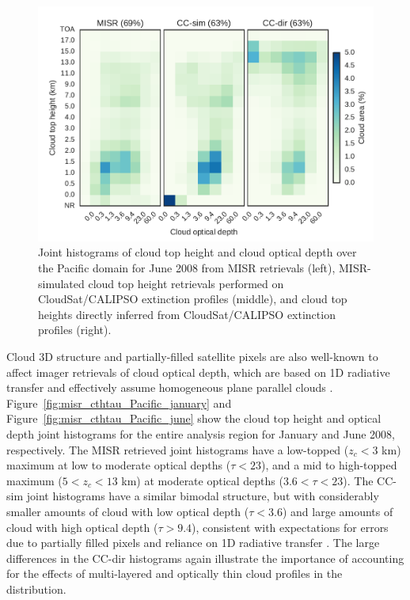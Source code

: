 \begin{figure}[tp]
\centering
\includegraphics{graphics/misr_clmisr_Pacific_2008-06.pdf}
\caption{\label{fig:misr_cthtau_Pacific_june}Joint histograms of cloud
top height and cloud optical depth over the Pacific domain for June 2008
from MISR retrievals (left), MISR-simulated cloud top height retrievals
performed on CloudSat/CALIPSO extinction profiles (middle), and cloud
top heights directly inferred from CloudSat/CALIPSO extinction profiles
(right).}\label{fig:misrux5fcthtauux5fPacificux5fjune}
\end{figure}

Cloud 3D structure and partially-filled satellite pixels are also
well-known to affect imager retrievals of cloud optical depth, which are
based on 1D radiative transfer and effectively assume homogeneous plane
parallel clouds \citep{yang_and_digirolamo_2008, evans_et_al_2008}.
Figure~\ref{fig:misr_cthtau_Pacific_january} and
Figure~\ref{fig:misr_cthtau_Pacific_june} show the cloud top height and
optical depth joint histograms for the entire analysis region for
January and June 2008, respectively. The MISR retrieved joint histograms
have a low-topped (\(z_c < 3\) km) maximum at low to moderate optical
depths (\(\tau < 23\)), and a mid to high-topped maximum
(\(5 < z_c < 13\) km) at moderate optical depths (\(3.6 < \tau < 23\)).
The CC-sim joint histograms have a similar bimodal structure, but with
considerably smaller amounts of cloud with low optical depth
(\(\tau < 3.6\)) and large amounts of cloud with high optical depth
(\(\tau > 9.4\)), consistent with expectations for errors due to
partially filled pixels and reliance on 1D radiative transfer
\citep{marchand_et_al_2010}. The large differences in the CC-dir
histograms again illustrate the importance of accounting for the effects
of multi-layered and optically thin cloud profiles in the distribution.

